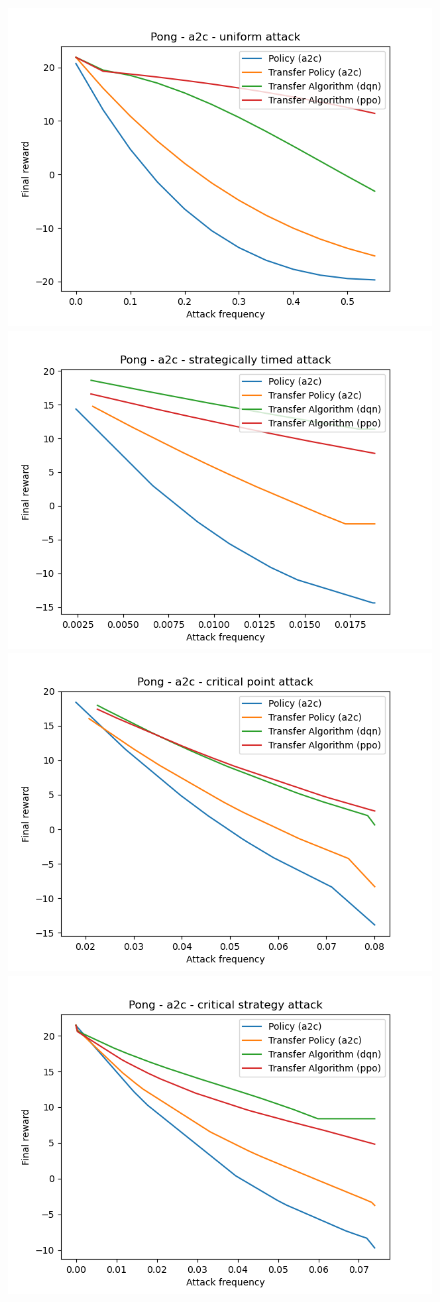 \begin{figure}


  \centering
    {\includegraphics[width=0.49\linewidth]{images/exp1/a2c-pong-uniform.png}}
    {\includegraphics[width=0.49\linewidth]{images/exp1/a2c-pong-strategically_timed.png}}
    {\includegraphics[width=0.49\linewidth]{images/exp1/a2c-pong-critical_point.png}}
    {\includegraphics[width=0.49\linewidth]{images/exp1/a2c-pong-critical_strategy.png}}

\end{figure}
